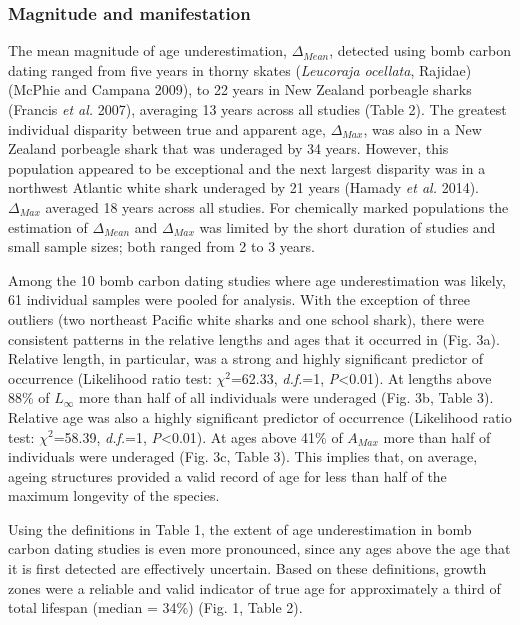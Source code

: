 \documentclass[]{article}
\begin{document}
\subsubsection{Magnitude and
manifestation}\label{magnitude-and-manifestation}

The mean magnitude of age underestimation, \(\Delta_{Mean}\), detected
using bomb carbon dating ranged from five years in thorny skates
(\emph{Leucoraja ocellata}, Rajidae) (McPhie and Campana 2009), to 22
years in New Zealand porbeagle sharks (Francis \emph{et al.} 2007),
averaging 13 years across all studies (Table 2). The greatest individual
disparity between true and apparent age, \(\Delta_{Max}\), was also in a
New Zealand porbeagle shark that was underaged by 34 years. However,
this population appeared to be exceptional and the next largest
disparity was in a northwest Atlantic white shark underaged by 21 years
(Hamady \emph{et al.} 2014). \(\Delta_{Max}\) averaged 18 years across
all studies. For chemically marked populations the estimation of
\(\Delta_{Mean}\) and \(\Delta_{Max}\) was limited by the short duration
of studies and small sample sizes; both ranged from 2 to 3 years.

Among the 10 bomb carbon dating studies where age underestimation was
likely, 61 individual samples were pooled for analysis. With the
exception of three outliers (two northeast Pacific white sharks and one
school shark), there were consistent patterns in the relative lengths
and ages that it occurred in (Fig. 3a). Relative length, in particular,
was a strong and highly significant predictor of occurrence (Likelihood
ratio test: \(\chi^2\)=62.33, \emph{d.f.}=1, \emph{P}\textless{}0.01).
At lengths above 88\% of \(L_\infty\) more than half of all individuals
were underaged (Fig. 3b, Table 3). Relative age was also a highly
significant predictor of occurrence (Likelihood ratio test:
\(\chi^2\)=58.39, \emph{d.f.}=1, \emph{P}\textless{}0.01). At ages above
41\% of \(A_{Max}\) more than half of individuals were underaged (Fig.
3c, Table 3). This implies that, on average, ageing structures provided
a valid record of age for less than half of the maximum longevity of the
species.

Using the definitions in Table 1, the extent of age underestimation in
bomb carbon dating studies is even more pronounced, since any ages above
the age that it is first detected are effectively uncertain. Based on
these definitions, growth zones were a reliable and valid indicator of
true age for approximately a third of total lifespan (median = 34\%)
(Fig. 1, Table 2).
\end{document}

